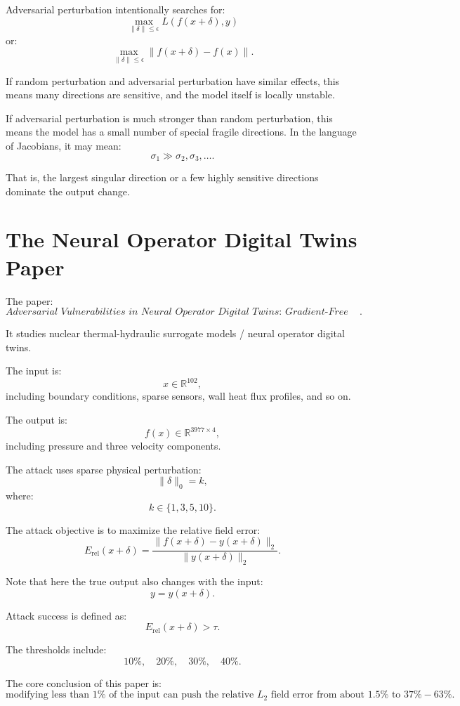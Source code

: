 \documentclass{article}
\begin{document}
Adversarial perturbation intentionally searches for:
\[
\max_{\|\delta\|\leq \epsilon}
L(f(x+\delta),y)
\]
or:
\[
\max_{\|\delta\|\leq \epsilon}
\|f(x+\delta)-f(x)\|.
\]

If random perturbation and adversarial perturbation have similar effects, this means many directions are sensitive, and the model itself is locally unstable.

If adversarial perturbation is much stronger than random perturbation, this means the model has a small number of special fragile directions. In the language of Jacobians, it may mean:
\[
\sigma_1\gg \sigma_2,\sigma_3,\ldots.
\]

That is, the largest singular direction or a few highly sensitive directions dominate the output change.

\section{The Neural Operator Digital Twins Paper}

The paper:
\[
\textit{Adversarial Vulnerabilities in Neural Operator Digital Twins: Gradient-Free Attacks on Nuclear Thermal-Hydraulic Surrogates}.
\]

It studies nuclear thermal-hydraulic surrogate models / neural operator digital twins.

The input is:
\[
x\in\mathbb{R}^{102},
\]
including boundary conditions, sparse sensors, wall heat flux profiles, and so on.

The output is:
\[
f(x)\in\mathbb{R}^{3977\times 4},
\]
including pressure and three velocity components.

The attack uses sparse physical perturbation:
\[
\|\delta\|_0=k,
\]
where:
\[
k\in\{1,3,5,10\}.
\]

The attack objective is to maximize the relative field error:
\[
E_{\mathrm{rel}}(x+\delta)
=
\frac{
\|f(x+\delta)-y(x+\delta)\|_2
}{
\|y(x+\delta)\|_2
}.
\]

Note that here the true output also changes with the input:
\[
y=y(x+\delta).
\]

Attack success is defined as:
\[
E_{\mathrm{rel}}(x+\delta)>\tau.
\]

The thresholds include:
\[
10\%,\quad 20\%,\quad 30\%,\quad 40\%.
\]

The core conclusion of this paper is:
\[
\text{modifying less than }1\%\text{ of the input can push the relative }L_2\text{ field error from about }1.5\%\text{ to }37\%-63\%.
\]
\end{document}
